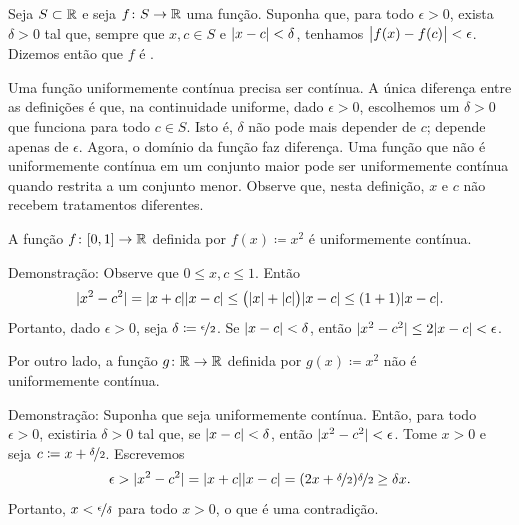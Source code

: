 \begin{defn}
Seja $S \subset {\mathbb{R}}$ e seja $f \colon S \to {\mathbb{R}}$ uma função.
Suponha que, para todo $\epsilon > 0$, exista $\delta > 0$
tal que, sempre que $x,c \in S$ e
$\lvert {x-c} \rvert < \delta$, tenhamos $\bigl\lvert {f(x)-f(c)} \bigr\rvert < \epsilon$.
Dizemos então que $f$ é \emph{}.
\end{defn}

Uma função uniformemente contínua precisa ser contínua.
A única diferença entre as definições é que, na continuidade uniforme,
dado $\epsilon > 0$, escolhemos um $\delta > 0$ que funciona para todo
$c \in S$. Isto é, $\delta$ não pode mais depender de $c$;
depende apenas de $\epsilon$. Agora, o domínio da função faz diferença.
Uma função que não é uniformemente contínua em um conjunto maior pode ser
uniformemente contínua quando restrita a um conjunto menor.
Observe que, nesta definição, $x$ e $c$ não recebem tratamentos diferentes.

\begin{example}
A função $f \colon [0,1] \to {\mathbb{R}}$ definida por $f(x) \coloneqq x^2$
é uniformemente contínua.

Demonstração: Observe que $0 \leq x,c \leq 1$. Então
\begin{equation*}
\lvert {x^2-c^2} \rvert = \lvert {x+c} \rvert\lvert {x-c} \rvert
\leq \bigl(\lvert {x} \rvert+\lvert {c} \rvert\bigr)\lvert {x-c} \rvert
\leq (1+1)\lvert {x-c} \rvert .
\end{equation*}
Portanto, dado $\epsilon > 0$, seja $\delta \coloneqq \nicefrac{\epsilon}{2}$.
Se $\lvert {x-c} \rvert < \delta$, então
$\lvert {x^2-c^2} \rvert \leq 2\lvert {x-c} \rvert < \epsilon$.

\medskip

Por outro lado, a função $g \colon {\mathbb{R}} \to {\mathbb{R}}$ definida por $g(x) \coloneqq x^2$
não é uniformemente contínua.

Demonstração: Suponha que seja uniformemente contínua.
Então, para todo $\epsilon > 0$, existiria $\delta > 0$ tal que,
se $\lvert {x-c} \rvert < \delta$, então $\lvert {x^2-c^2} \rvert < \epsilon$.
Tome $x > 0$ e seja
$c \coloneqq x+\nicefrac{\delta}{2}$. Escrevemos
\begin{equation*}
\epsilon >
\lvert {x^2-c^2} \rvert = \lvert {x+c} \rvert\lvert {x-c} \rvert
=
(2x+\nicefrac{\delta}{2})\nicefrac{\delta}{2}
\geq
\delta x .
\end{equation*}
Portanto, $x < \nicefrac{\epsilon}{\delta}$ para todo $x > 0$,
o que é uma contradição.
\end{example}



